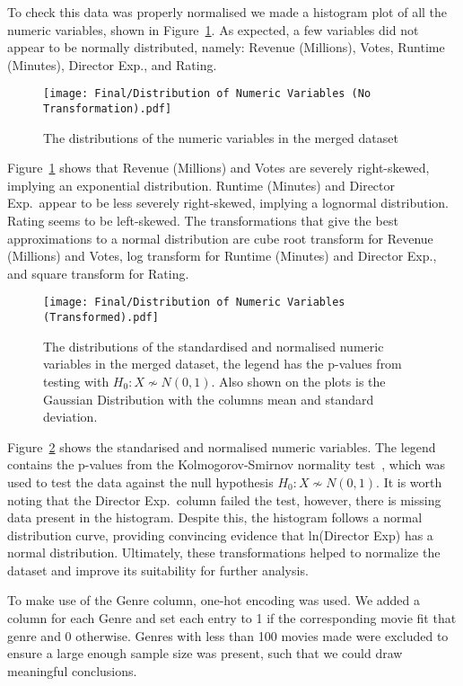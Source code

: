         To check this data was properly normalised we made a histogram plot of all the
            numeric variables, shown in Figure~\ref{fig-distribution-of-numeric-variable}.
        As expected, a few variables did not appear to be normally distributed, namely:
            Revenue (Millions), Votes, Runtime (Minutes), Director Exp., and Rating.
        \begin{figure}[H]
            \centering
            \texttt{[image: Final/Distribution of Numeric Variables (No Transformation).pdf]}
            \caption[short]{The distributions of the numeric variables in the merged dataset}\label{fig-distribution-of-numeric-variable}
        \end{figure}
        Figure~\ref{fig-distribution-of-numeric-variable} shows that Revenue (Millions)
            and Votes are severely right-skewed, implying an exponential distribution.
        Runtime (Minutes) and Director Exp.~appear to be less severely right-skewed,
            implying a lognormal distribution.
        Rating seems to be left-skewed.
        The transformations that give the best approximations to a normal distribution
            are cube root transform for Revenue (Millions) and Votes, log transform for
            Runtime (Minutes) and Director Exp., and square transform for Rating.
        \begin{figure}[H]
            \centering
            \texttt{[image: Final/Distribution of Numeric Variables (Transformed).pdf]}
            \caption[short]{
                The distributions of the standardised and normalised numeric variables in the merged dataset,
                the legend has the p-values from testing with $H_{0}: X \not\sim N(0,1)$.
                Also shown on the plots is the Gaussian Distribution with the columns mean and
                    standard deviation.
            }\label{fig-transformed-distribution-of-numeric-variable}
        \end{figure}
        Figure~\ref{fig-transformed-distribution-of-numeric-variable} shows the
            standarised and normalised numeric variables.
        The legend contains the p-values from the Kolmogorov-Smirnov normality
            test~\cite{KStest}, which was used to test the data against the null hypothesis
            $H_{0}: X \not\sim N(0,1)$.
        It is worth noting that the Director Exp.~column failed the test, however,
            there is missing data present in the histogram.
        Despite this, the histogram follows a normal distribution curve, providing
            convincing evidence that ln(Director Exp) has a normal distribution.
        Ultimately, these transformations helped to normalize the dataset and improve
            its suitability for further analysis.

        To make use of the Genre column, one-hot encoding was used.
        We added a column for each Genre and set each entry to 1 if the corresponding
            movie fit that genre and 0 otherwise.
        Genres with less than 100 movies made were excluded to ensure a large enough
            sample size was present, such that we could draw meaningful conclusions.
